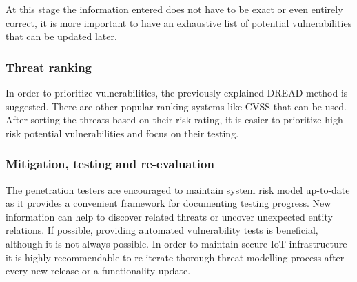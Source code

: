 At this stage the information entered does not have to be exact or even entirely correct, it is more important to have an exhaustive list of potential vulnerabilities that can be updated later.

	\subsubsection{Threat ranking}
	
	In order to prioritize vulnerabilities, the previously explained DREAD method is suggested. There are other popular ranking systems like CVSS\cite{cvss} that can be used. After sorting the threats based on their risk rating, it is easier to prioritize high-risk potential vulnerabilities and focus on their testing. 
	
	\subsubsection{Mitigation, testing and re-evaluation}
	
	The penetration testers are encouraged to maintain system risk model up-to-date as it provides a convenient framework for documenting testing progress. New information can help to discover related threats or uncover unexpected entity relations. \newline
	If possible, providing automated vulnerability tests is beneficial, although it is not always possible.
	In order to maintain secure IoT infrastructure it is highly recommendable to re-iterate thorough threat modelling process after every new release or a functionality update\cite{1392709}.